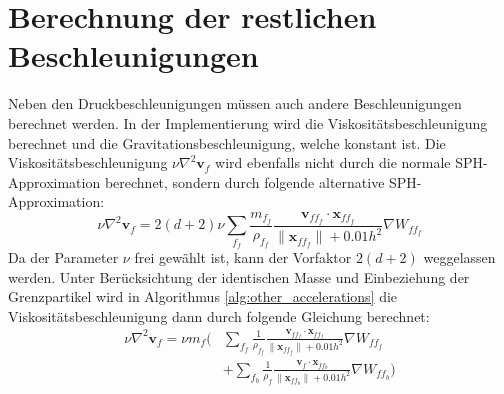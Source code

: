 \documentclass[11pt,
a4paper,
parskip=half, %
BCOR=10mm, %
english,
ngerman]{scrreprt}
\begin{document}
\section{Berechnung der restlichen Beschleunigungen}
Neben den Druckbeschleunigungen müssen auch andere Beschleunigungen berechnet werden.
In der Implementierung wird die Viskositätsbeschleunigung berechnet und die Gravitationsbeschleunigung, welche konstant ist.
Die Viskositätsbeschleunigung $\nu \nabla^2 \textbf{v}_f$ wird ebenfalls nicht durch die normale SPH-Approximation berechnet,
sondern durch folgende alternative SPH-Approximation:
\begin{equation}
    \nu \nabla^2 \textbf{v}_f = 2(d + 2) \nu \sum_{f_f} \frac{m_{f_f}}{\rho_{f_f}} \frac{\textbf{v}_{ff_f} \cdot \textbf{x}_{ff_f}}{\|\textbf{x}_{ff_f}\| + 
    0.01h^2} \nabla W_{ff_f}
\end{equation}
Da der Parameter $\nu$ frei gewählt ist, kann der Vorfaktor $2(d+2)$ weggelassen werden.
Unter Berücksichtung der identischen Masse und Einbeziehung der Grenzpartikel wird in Algorithmus \ref{alg:other_accelerations} die Viskositätsbeschleunigung
dann durch folgende Gleichung berechnet:
\begin{align}
    \nu \nabla^2 \textbf{v}_f = \nu m_f \biggl(&\sum_{f_f} \frac{1}{\rho_{f_f}} \frac{\textbf{v}_{ff_f} \cdot \textbf{x}_{ff_f}}{\|\textbf{x}_{ff_f}\| + 
    0.01h^2} \nabla W_{ff_f}\\
    &+ \sum_{f_b} \frac{1}{\rho_f} \frac{\textbf{v}_f \cdot \textbf{x}_{ff_b}}{\|\textbf{x}_{ff_b}\| + 
    0.01h^2} \nabla W_{ff_b}
    \biggr)
\end{align}
\end{document}
